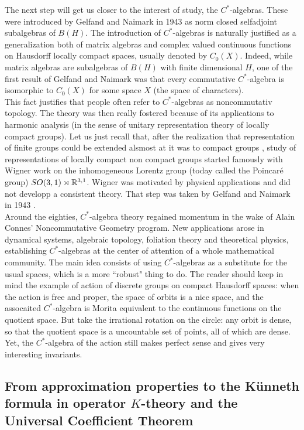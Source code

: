The next step will get us closer to the interest of study, the $C^*$-algebras. These were introduced by Gelfand and Naimark in 1943 as norm closed selfadjoint subalgebras of $B(H)$. The introduction of $C^*$-algebras is naturally justified as a generalization both of matrix algebras and complex valued continuous functions on Hausdorff locally compact spaces, usually denoted by $C_0(X)$. Indeed, while matrix algebras are subalgebras of $B(H)$ with finite dimensional $H$, one of the first result of Gelfand and Naimark was that every commutative $C^*$-algebra is isomorphic to $C_0(X)$ for some space $X$ (the space of characters).\\

This fact justifies that people often refer to $C^*$-algebras as noncommutativ topology. The theory was then really fostered because of its applications to harmonic analysis (in the sense of unitary representation theory of locally compact groups). Let us just recall that, after the realization that representation of finite groups could be extended alsmost at it was to compact groups \cite{PeterWeyl1927}, study of representations of locally compact non compact groups started famously with Wigner work on the inhomogeneous Lorentz group (today called the Poincar\'e group) $SO(3,1)\rtimes \mathbb{R}^{3,1}$. Wigner was motivated by physical applications and did not developp a consistent theory. That step was taken by Gelfand and Naimark in 1943 \cite{GeN1}. \\

Around the eighties, $C^*$-algebra theory regained momentum in the wake of Alain Connes' Noncommutative Geometry program. New applications arose in dynamical systems, algebraic topology, foliation theory and theoretical physics, establishing $C^*$-algebras at the center of attention of a whole mathematical community. The main idea consists of using $C^*$-algebras as a substitute for the usual spaces, which is a more ``robust" thing to do. The reader should keep in mind the example of action of discrete groups on compact Hausdorff spaces: when the action is free and proper, the space of orbits is a nice space, and the assocaited $C^*$-algebra is Morita equivalent to the continuous functions on the quotient space. But take the irrational rotation on the circle: any orbit is dense, so that the quotient space is a uncountable set of points, all of which are dense. Yet, the $C^*$-algebra of the action still makes perfect sense and gives very interesting invariants.          

\subsection{From approximation properties to the K\"unneth formula in operator $K$-theory and the Universal Coefficient Theorem}

